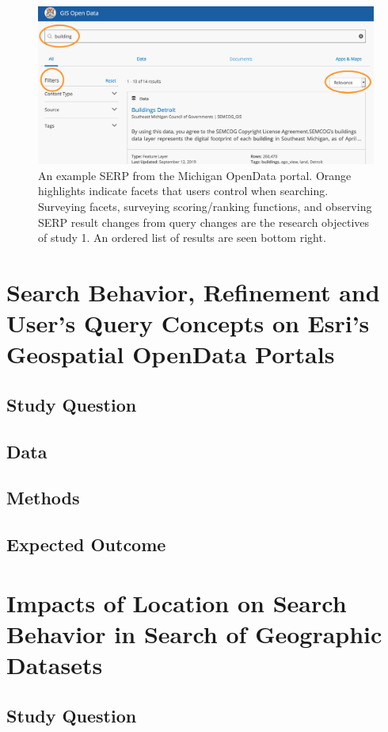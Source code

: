 \begin{figure}[H]
    \centering
    \includegraphics[width=1\textwidth]{../figures/Methods_OpenData.png}
    \caption{An example SERP from the Michigan OpenData portal. Orange highlights indicate facets that users control when searching. Surveying facets, surveying scoring/ranking functions, and observing SERP result changes from query changes are the research objectives of study 1. An ordered list of results are seen bottom right.}
    \label{fig:Methods_OpenData}
\end{figure}

\section{Search Behavior, Refinement and User's Query Concepts on Esri’s Geospatial OpenData Portals}
\subsection{Study Question}
\subsection{Data}
\subsection{Methods}
\subsection{Expected Outcome}

\section{Impacts of Location on Search Behavior in Search of Geographic  Datasets}
\subsection{Study Question}
